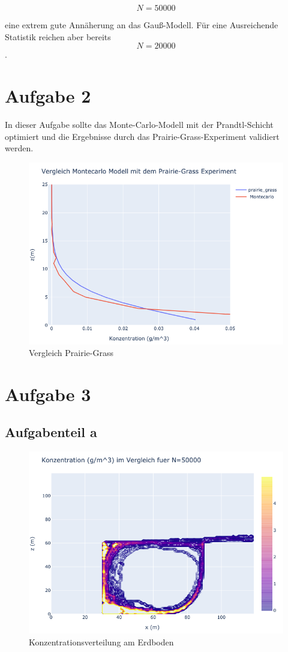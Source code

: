 \documentclass[ngerman]{scrartcl}
\begin{document}
\begin{equation}
	N=50000
\end{equation}

eine extrem gute Annäherung an das Gauß-Modell. Für eine Ausreichende Statistik reichen aber bereits 
\begin{equation}
	N=20000
\end{equation}.
\section{Aufgabe 2}
In dieser Aufgabe sollte das Monte-Carlo-Modell mit der Prandtl-Schicht optimiert und die Ergebnisse durch das Prairie-Grass-Experiment validiert werden.
\begin{figure}[H]
	\centering
	\includegraphics[scale=0.5]{Bilder/2back.png}
	\caption{Vergleich Prairie-Grass}
	\label{fig:my_label}
\end{figure}
\section{Aufgabe  3}
\subsection{Aufgabenteil a}
\begin{figure}[H]
	\centering
	\includegraphics[scale=0.5]{Bilder/3k_xq=60.5.png}
	\caption{Konzentrationsverteilung am Erdboden}
	\label{fig:my_label}
\end{figure}
\end{document}
